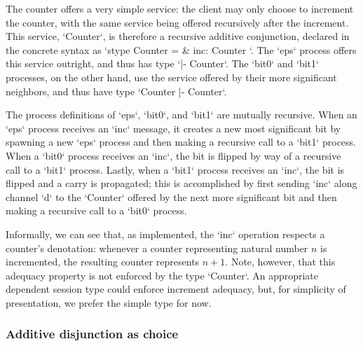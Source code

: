 The counter offers a very simple service: the client may only choose to increment the counter, with the same service being offered recursively after the increment.
This service, \msill`Counter`, is therefore a recursive additive conjunction,
declared in the concrete syntax as \msill`stype Counter = &{ inc: Counter }`.
The \msill`eps` process offers this service outright, and thus has type \msill`{|- Counter}`.
The \msill`bit0` and \msill`bit1` processes, on the other hand, use the service offered by their more significant neighbors, and thus have type \msill`{Counter |- Counter}`.

The process definitions of \msill`eps`, \msill`bit0`, and \msill`bit1` are mutually recursive.
When an \msill`eps` process receives an \msill`inc` message, it creates a new most significant bit by spawning a new \msill`eps` process and then making a recursive call to a \msill`bit1` process.
When a \msill`bit0` process receives an \msill`inc`, the bit is flipped by way of a recursive call to a \msill`bit1` process.
Lastly, when a \msill`bit1` process receives an \msill`inc`, the bit is flipped and a carry is propagated; this is accomplished by first sending \msill`inc` along channel \msill`d` to the \msill`Counter` offered by the next more significant bit and then making a recursive call to a \msill`bit0` process.

Informally, we can see that, as implemented, the \msill`inc` operation respects a counter's denotation: whenever a counter representing natural number $n$ is incremented, the resulting counter represents $n+1$.
Note, however, that this adequacy property is not enforced by the type \msill`Counter`.
An appropriate dependent session type could enforce increment adequacy, but, for simplicity of presentation, we prefer the simple type for now.


\subsubsection{Additive disjunction as choice}\label{sec:addit-disj-as-choice}

